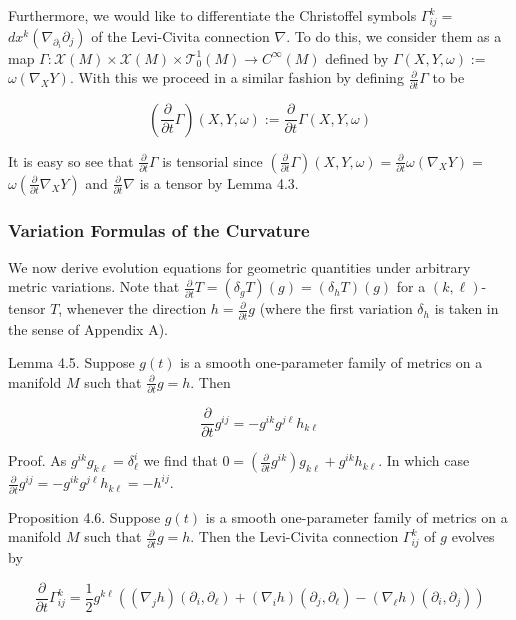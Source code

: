 \documentclass[10pt, letterpaper]{article}
\begin{document}
Furthermore, we would like to differentiate the Christoffel symbols $\Gamma_{i j}^{k}=$ $d x^{k}\left(\nabla_{\partial_{i}} \partial_{j}\right)$ of the Levi-Civita connection $\nabla$. To do this, we consider them as a map $\Gamma: \mathscr{X}(M) \times \mathscr{X}(M) \times \mathscr{T}_{0}^{1}(M) \rightarrow C^{\infty}(M)$ defined by $\Gamma(X, Y, \omega):=$ $\omega\left(\nabla_{X} Y\right)$. With this we proceed in a similar fashion by defining $\frac{\partial}{\partial t} \Gamma$ to be

$$
\left(\frac{\partial}{\partial t} \Gamma\right)(X, Y, \omega):=\frac{\partial}{\partial t} \Gamma(X, Y, \omega)
$$

It is easy so see that $\frac{\partial}{\partial t} \Gamma$ is tensorial since $\left(\frac{\partial}{\partial t} \Gamma\right)(X, Y, \omega)=\frac{\partial}{\partial t} \omega\left(\nabla_{X} Y\right)=$ $\omega\left(\frac{\partial}{\partial t} \nabla_{X} Y\right)$ and $\frac{\partial}{\partial t} \nabla$ is a tensor by Lemma 4.3.

\subsubsection*{Variation Formulas of the Curvature}
We now derive evolution equations for geometric quantities under arbitrary metric variations. Note that $\frac{\partial}{\partial t} T=\left(\delta_{\dot{g}} T\right)(g)=\left(\delta_{h} T\right)(g)$ for a $(k, \ell)$-tensor $T$, whenever the direction $h=\frac{\partial}{\partial t} g$ (where the first variation $\delta_{h}$ is taken in the sense of Appendix A).

Lemma 4.5. Suppose $g(t)$ is a smooth one-parameter family of metrics on a manifold $M$ such that $\frac{\partial}{\partial t} g=h$. Then

$$
\frac{\partial}{\partial t} g^{i j}=-g^{i k} g^{j \ell} h_{k \ell}
$$

Proof. As $g^{i k} g_{k \ell}=\delta_{\ell}^{i}$ we find that $0=\left(\frac{\partial}{\partial t} g^{i k}\right) g_{k \ell}+g^{i k} h_{k \ell}$. In which case $\frac{\partial}{\partial t} g^{i j}=-g^{i k} g^{j \ell} h_{k \ell}=-h^{i j}$.

Proposition 4.6. Suppose $g(t)$ is a smooth one-parameter family of metrics on a manifold $M$ such that $\frac{\partial}{\partial t} g=h$. Then the Levi-Civita connection $\Gamma_{i j}^{k}$ of $g$ evolves by

$$
\frac{\partial}{\partial t} \Gamma_{i j}^{k}=\frac{1}{2} g^{k \ell}\left(\left(\nabla_{j} h\right)\left(\partial_{i}, \partial_{\ell}\right)+\left(\nabla_{i} h\right)\left(\partial_{j}, \partial_{\ell}\right)-\left(\nabla_{\ell} h\right)\left(\partial_{i}, \partial_{j}\right)\right)
$$
\end{document}
